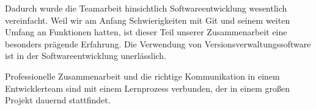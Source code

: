 Dadurch wurde die Teamarbeit hinsichtlich Softwareentwicklung wesentlich vereinfacht. Weil wir am Anfang Schwierigkeiten mit Git und seinem weiten Umfang an Funktionen hatten, ist dieser Teil unserer Zusammenarbeit eine besonders prägende Erfahrung. Die Verwendung von Versionsverwaltungssoftware ist in der Softwareentwicklung unerlässlich.

Professionelle Zusammenarbeit und die richtige Kommunikation in einem Entwicklerteam sind mit einem Lernprozess verbunden, der in einem großen Projekt dauernd stattfindet.